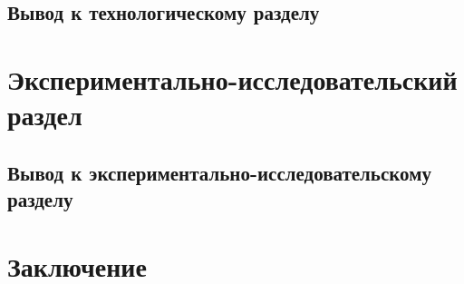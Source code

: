 \documentclass[a4paper,14pt]{extreport}
\begin{document}
\section*{Вывод к технологическому разделу}

\chapter{Экспериментально-исследовательский раздел}

\section*{Вывод к экспериментально-исследовательскому разделу}

\chapter*{Заключение}


\newpage
{}
\renewcommand\bibname{Список литературы}
\end{document}
